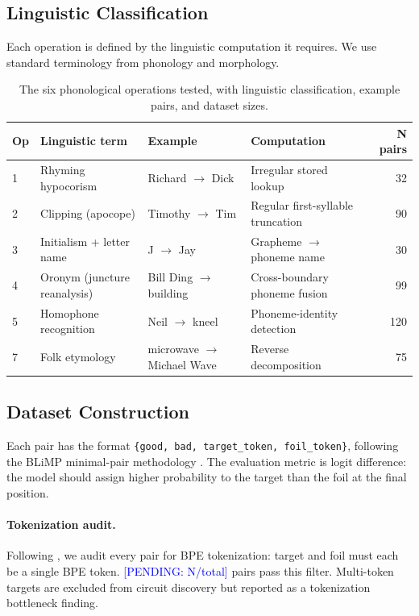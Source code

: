 \documentclass[11pt,a4paper]{article}
\newcommand{\PENDING}[1]{\textcolor{blue}{[PENDING: #1]}}
\begin{document}
\subsection{Linguistic Classification}

Each operation is defined by the linguistic computation it requires. We use
standard terminology from phonology and morphology.

\begin{table}[h!]
\centering
\caption{The six phonological operations tested, with linguistic classification,
example pairs, and dataset sizes.}
\label{tab:operations}
\small
\begin{tabular}{llllr}
\toprule
\textbf{Op} & \textbf{Linguistic term} & \textbf{Example} & \textbf{Computation} & \textbf{N pairs} \\
\midrule
1 & Rhyming hypocorism & Richard $\to$ Dick & Irregular stored lookup & 32 \\
2 & Clipping (apocope) & Timothy $\to$ Tim & Regular first-syllable truncation & 90 \\
3 & Initialism + letter name & J $\to$ Jay & Grapheme $\to$ phoneme name & 30 \\
4 & Oronym (juncture reanalysis) & Bill Ding $\to$ building & Cross-boundary phoneme fusion & 99 \\
5 & Homophone recognition & Neil $\to$ kneel & Phoneme-identity detection & 120 \\
7 & Folk etymology & microwave $\to$ Michael Wave & Reverse decomposition & 75 \\
\bottomrule
\end{tabular}
\end{table}

\subsection{Dataset Construction}

Each pair has the format \texttt{\{good, bad, target\_token, foil\_token\}},
following the BLiMP minimal-pair methodology \citep{warstadt2020blimp}. The
evaluation metric is logit difference: the model should assign higher
probability to the target than the foil at the final position.

\paragraph{Tokenization audit.}
Following \citet{liao2026tokenization}, we audit every pair for BPE
tokenization: target and foil must each be a single BPE token.
\PENDING{N/total} pairs pass this filter. Multi-token targets are excluded
from circuit discovery but reported as a tokenization bottleneck finding.
\end{document}

